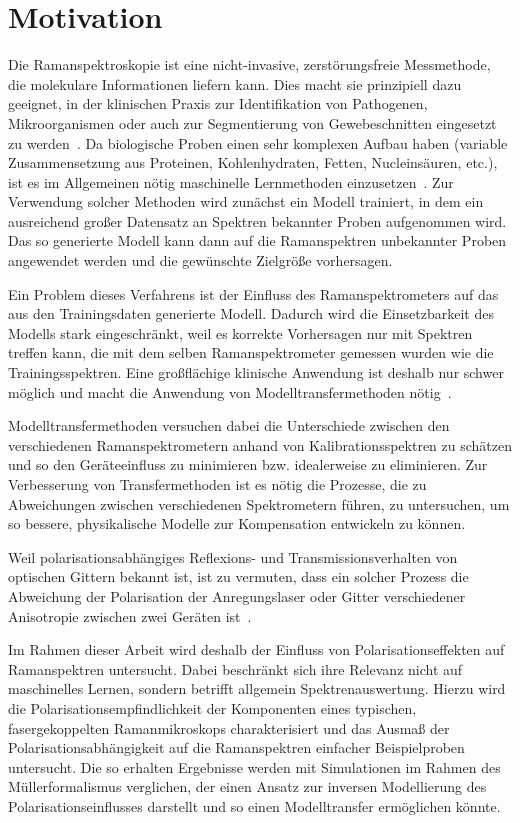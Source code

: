 \documentclass[a4paper,12pt,twoside,parskip=no,headsepline,open=right,ngerman,export]{scrreprt}
\begin{document}
    \chapter{Motivation}
        
        Die Ramanspektroskopie ist eine nicht-invasive, zerstörungsfreie Messmethode, die molekulare Informationen liefern kann. Dies macht sie prinzipiell dazu geeignet, in der klinischen Praxis zur Identifikation von Pathogenen, Mikroorganismen oder auch zur Segmentierung von Gewebeschnitten eingesetzt zu werden~\cite{eberhardt_advantages_2015, cialla-may_recent_2017, krafft_raman_2009}.
        Da biologische Proben einen sehr komplexen Aufbau haben (variable Zusammensetzung aus Proteinen, Kohlenhydraten, Fetten, Nucleinsäuren, etc.), ist es im Allgemeinen nötig maschinelle Lernmethoden einzusetzen~\cite{krafft_label-free_2017}. Zur Verwendung solcher Methoden wird zunächst ein Modell trainiert, in dem ein ausreichend großer Datensatz an Spektren bekannter Proben aufgenommen wird. Das so generierte Modell kann dann auf die Ramanspektren unbekannter Proben angewendet werden und die gewünschte Zielgröße vorhersagen.

        Ein Problem dieses Verfahrens ist der Einfluss des Ramanspektrometers auf das aus den Trainingsdaten generierte Modell. Dadurch wird die Einsetzbarkeit des Modells stark eingeschränkt, weil es korrekte Vorhersagen nur mit Spektren treffen kann, die mit dem selben Ramanspektrometer gemessen wurden wie die Trainingsspektren. Eine großflächige klinische Anwendung ist deshalb nur schwer möglich und macht die Anwendung von Modelltransfermethoden nötig~\cite{guo_model_2018}. 
        
        Modelltransfermethoden versuchen dabei die Unterschiede zwischen den verschiedenen Ramanspektrometern anhand von Kalibrationsspektren zu schätzen und so den Geräteeinfluss zu minimieren bzw. idealerweise zu eliminieren.
        Zur Verbesserung von Transfermethoden ist es nötig die Prozesse, die zu Abweichungen zwischen verschiedenen Spektrometern führen, zu untersuchen, um so bessere, physikalische Modelle zur Kompensation entwickeln zu können.
        
        Weil polarisationsabhängiges Reflexions- und Transmissionsverhalten von optischen Gittern bekannt ist, ist zu vermuten, dass ein solcher Prozess die Abweichung der Polarisation der Anregungslaser oder Gitter verschiedener Anisotropie zwischen zwei Geräten ist~\cite{kho_reduction_2005}.
        
        Im Rahmen dieser Arbeit wird deshalb der Einfluss von Polarisationseffekten auf Ramanspektren untersucht. Dabei beschränkt sich ihre Relevanz nicht auf maschinelles Lernen, sondern betrifft allgemein Spektrenauswertung. Hierzu wird die Polarisationsempfindlichkeit der Komponenten eines typischen, fasergekoppelten Ramanmikroskops charakterisiert und das Ausmaß der Polarisationsabhängigkeit auf die Ramanspektren einfacher Beispielproben untersucht. Die so erhalten Ergebnisse werden mit Simulationen im Rahmen des Müllerformalismus verglichen, der einen Ansatz zur inversen Modellierung des Polarisationseinflusses darstellt und so einen Modelltransfer ermöglichen könnte.
        
\end{document}

